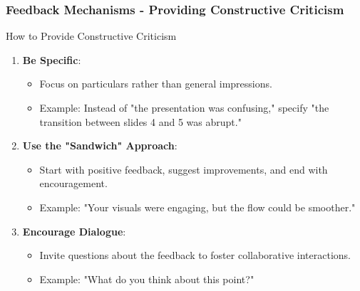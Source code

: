 \documentclass[aspectratio=169]{beamer}
\begin{document}
\begin{frame}[fragile]
    \frametitle{Feedback Mechanisms - Providing Constructive Criticism}
    \begin{block}{How to Provide Constructive Criticism}
        \begin{enumerate}
            \item \textbf{Be Specific}:
                \begin{itemize}
                    \item Focus on particulars rather than general impressions.
                    \item Example: Instead of "the presentation was confusing," specify "the transition between slides 4 and 5 was abrupt."
                \end{itemize}
            \item \textbf{Use the "Sandwich" Approach}:
                \begin{itemize}
                    \item Start with positive feedback, suggest improvements, and end with encouragement.
                    \item Example: "Your visuals were engaging, but the flow could be smoother."
                \end{itemize}
            \item \textbf{Encourage Dialogue}:
                \begin{itemize}
                    \item Invite questions about the feedback to foster collaborative interactions.
                    \item Example: "What do you think about this point?"
                \end{itemize}
        \end{enumerate}
    \end{block}
\end{frame}
\end{document}
